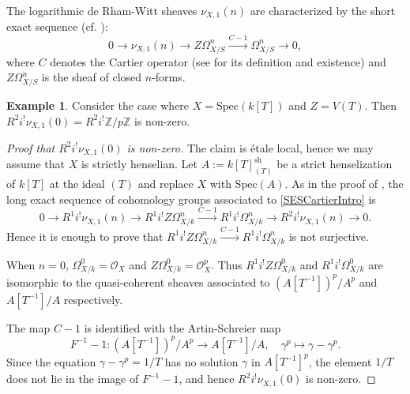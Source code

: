 \documentclass{amsart}
\def\Spec{\textrm{Spec}}
\theoremstyle{definition}
\newtheorem{example}[theorem]{Example}
\newcommand{\mbZ}{\mathbb{Z}}
\numberwithin{equation}{section}
\begin{document}
The logarithmic de Rham-Witt sheaves $\nu_{X,1}(n)$ are characterized by the short exact sequence (cf. \cite{MilneDuality}):
\begin{equation}\label{SESCartierIntro}
	0 \to \nu_{X,1}(n) \to Z \Omega^n_{X/S} \xrightarrow{C - 1} \Omega^n_{X/S} \to 0,
\end{equation}
where $C$ denotes the Cartier operator (see \cite[Lemma 1.1]{MilneDuality} for its definition and existence) and $Z \Omega^n_{X/S}$ is the sheaf of closed $n$-forms.
\begin{example}\label{Ex:CounterExampleVanishing}
	Consider the case where $X = \Spec(k[T])$ and $Z = V(T)$. Then $R^2 i^! \nu_{X,1}(0)=R^2 i^! \mbZ/p\mbZ$ is non-zero.
\end{example}

\begin{proof}[Proof that $R^2 i^! \nu_{X,1}(0)$ is non-zero]
		The claim is étale local, hence we may assume that $X$ is strictly henselian. Let $A:= k[T]^{\mathrm{sh}}_{(T)}$ be a strict henselization of $k[T]$ at the ideal $(T)$ and replace $X$ with $\Spec(A)$.
		As in the proof of \cite[Theorem 2.1]{MilneValuesOfZeta}, the long exact sequence of cohomology groups associated to \eqref{SESCartierIntro} is
		\[
		0\to R^{1}i^!\nu_{X,1}(n)\to R^1i^!Z\Omega_{X/k}^n\xrightarrow{C-1} R^1i^!\Omega_{X/k}^n\to R^{2}i^!\nu_{X,1}(n)\to 0.
		\]
		Hence it is enough to prove that $R^1i^!Z\Omega_{X/k}^n\xrightarrow{C-1} R^1i^!\Omega_{X/k}^n$ is not surjective.
		
	When $n=0$, $\Omega^0_{X/k} = \mathcal{O}_X$ and $Z\Omega^0_{X/k} = \mathcal{O}_X^p$. Thus $R^1 i^! Z \Omega^0_{X/k}$ and $R^1 i^! \Omega^0_{X/k}$ are isomorphic to the quasi-coherent sheaves associated to $(A[T^{-1}])^p/A^p$  and $A[T^{-1}]/A$ respectively.
	
	
	The map $C - 1$ is identified with the Artin-Schreier map $$F^{-1} - 1 : (A[T^{-1}])^p/A^p \to A[T^{-1}]/A, \quad \gamma^p\mapsto \gamma-\gamma^p.$$ Since the equation $\gamma-\gamma^p = 1/T$ has no solution $\gamma$ in $A[T^{-1}]^p$, the element $1/T$ does not lie in the image of $F^{-1} - 1$, and hence $R^2 i^! \nu_{X,1}(0)$ is non-zero.
\end{proof}
\end{document}
